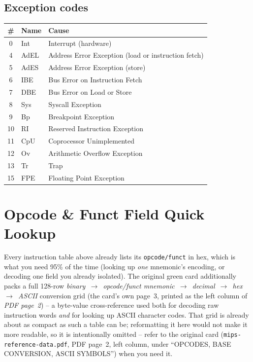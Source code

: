 \documentclass[10pt]{article}
\newcommand{\op}[1]{\texttt{#1}}
\begin{document}
\subsection{Exception codes}
\begin{center}
\begin{tabular}{@{}clp{5cm}@{}}
\toprule
\# & Name & Cause \\
\midrule
0  & Int   & Interrupt (hardware) \\
4  & AdEL  & Address Error Exception (load or instruction fetch) \\
5  & AdES  & Address Error Exception (store) \\
6  & IBE   & Bus Error on Instruction Fetch \\
7  & DBE   & Bus Error on Load or Store \\
8  & Sys   & Syscall Exception \\
9  & Bp    & Breakpoint Exception \\
10 & RI    & Reserved Instruction Exception \\
11 & CpU   & Coprocessor Unimplemented \\
12 & Ov    & Arithmetic Overflow Exception \\
13 & Tr    & Trap \\
15 & FPE   & Floating Point Exception \\
\bottomrule
\end{tabular}
\end{center}

\section{Opcode \& Funct Field Quick Lookup}

Every instruction table above already lists its \op{opcode/funct} in hex,
which is what you need 95\% of the time (looking up \emph{one} mnemonic's
encoding, or decoding one field you already isolated). The original green
card additionally packs a full 128-row \emph{binary~$\to$~opcode/funct
mnemonic~$\to$~decimal~$\to$~hex~$\to$~ASCII} conversion grid (the card's
own page~3, printed as the left column of \emph{PDF page~2}) -- a
byte-value cross-reference used both for decoding raw instruction words
\emph{and} for looking up ASCII character codes. That grid is already
about as compact as such a table can be; reformatting it here would not
make it more readable, so it is intentionally omitted -- refer to the
original card (\texttt{mips-reference-data.pdf}, PDF page~2, left column,
under ``OPCODES, BASE CONVERSION, ASCII SYMBOLS'') when you need it.
\end{document}

